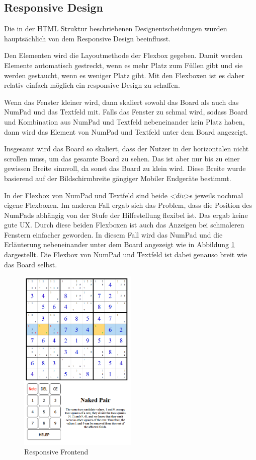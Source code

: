 \subsection{Responsive Design}

Die in der \ac{HTML} Struktur beschriebenen Designentscheidungen wurden hauptsächlich von dem Responsive Design beeinflusst. 

Den Elementen wird die Layoutmethode der Flexbox gegeben. Damit werden Elemente automatisch gestreckt, wenn es mehr Platz zum Füllen gibt und sie werden gestaucht, wenn es weniger Platz gibt. Mit den Flexboxen ist es daher relativ einfach möglich ein responsive Design zu schaffen. 

Wenn das Fenster kleiner wird, dann skaliert sowohl das Board als auch das NumPad und das Textfeld mit. Falls das Fenster zu schmal wird, sodass Board und Kombination aus NumPad und Textfeld nebeneinander kein Platz haben, dann wird das Element von NumPad und Textfeld unter dem Board angezeigt.

Insgesamt wird das Board so skaliert, dass der Nutzer in der horizontalen nicht scrollen muss, um das gesamte Board zu sehen. Das ist aber nur bis zu einer gewissen Breite sinnvoll, da sonst das Board zu klein wird. Diese Breite wurde basierend auf der Bildschirmbreite gängiger Mobiler Endgeräte bestimmt.

In der Flexbox von NumPad und Textfeld sind beide \textit{<div>}s jeweils nochmal eigene Flexboxen. Im anderen Fall ergab sich das Problem, dass die Position des NumPads abhängig von der Stufe der Hilfestellung flexibel ist. Das ergab keine gute \ac{UX}. Durch diese beiden Flexboxen ist auch das Anzeigen bei schmaleren Fenstern einfacher geworden. In diesem Fall wird das NumPad und die Erläuterung nebeneinander unter dem Board angezeigt wie in Abbildung \ref{fig:Responsiv} dargestellt. Die Flexbox von NumPad und Textfeld ist dabei genauso breit wie das Board selbst.

\begin{figure}[H]
	\centering
	\includegraphics[width=0.5\textwidth]{images/Bilduntereinander.png}
	\caption{Responsive Frontend}
	\label{fig:Responsiv}
\end{figure}

